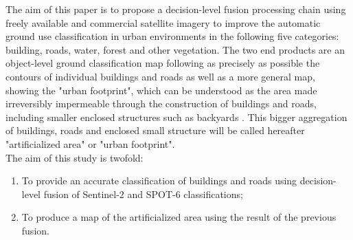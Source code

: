 \documentclass[10pt]{article}
\begin{document}
The aim of this paper is to propose a decision-level fusion processing chain using freely available and commercial satellite imagery to improve the automatic ground use classification in urban environments in the following five categories: building, roads, water, forest and other vegetation. The two end products are an object-level ground classification map following as precisely as possible the contours of individual buildings and roads as well as a more general map, showing the "urban footprint", which can be understood as the area made irreversibly impermeable through the construction of buildings and roads, including smaller enclosed structures such as backyards \parencite{puissant_object-oriented_2014}. This bigger aggregation of buildings, roads and enclosed small structure will be called hereafter "artificialized area" or "urban footprint".\\

The aim of this study is twofold:
\begin{enumerate}
    \item To provide an accurate classification of buildings and roads using decision-level fusion of Sentinel-2 and SPOT-6 classifications;
    \item To produce a map of the artificialized area using the result of the previous fusion. 
\end{enumerate}

\end{document}
